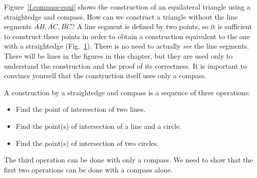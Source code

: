 Figure~\ref{f.compass-equi} shows the construction of an equilateral triangle using a straightedge and compass. How can we construct a triangle without the line segments $\overline{AB}, \overline{AC}, \overline{BC}$? A line segment is defined by two points, so it is sufficient to construct these points in order to obtain a construction equivalent to the one with a straightedge (Fig.~\ref{f.compass-equi-only}). There is no need to actually \emph{see} the line segments.
There will be lines in the figures in this chapter, but they are used only to understand the construction and the proof of its correctness. It is important to convince yourself that the construction itself uses only a compass.
\begin{figure}[ht]
\subfigures
{}
\hfill
{}
\label{f.compass-equi}
\label{f.compass-equi-only}
\end{figure}


A construction by a straightedge and compass is a sequence of three operations:
\begin{itemize}
\item Find the point of intersection of two lines.
\item Find the point(s) of intersection of a line and a circle.
\item Find the point(s) of intersection of two circles.
\end{itemize}
The third operation can be done with only a compass. We need to show that the first two operations can be done with a compass alone.

